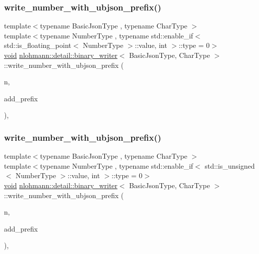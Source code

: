 \subsubsection{\texorpdfstring{write\+\_\+number\+\_\+with\+\_\+ubjson\+\_\+prefix()}{write\_number\_with\_ubjson\_prefix()}\hspace{0.1cm}{\footnotesize\ttfamily [1/3]}}
{\footnotesize\ttfamily template$<$typename Basic\+Json\+Type , typename Char\+Type $>$ \\
template$<$typename Number\+Type , typename std\+::enable\+\_\+if$<$ std\+::is\+\_\+floating\+\_\+point$<$ Number\+Type $>$\+::value, int $>$\+::type  = 0$>$ \\
\hyperlink{namespacenlohmann_1_1detail_a59fca69799f6b9e366710cb9043aa77d}{void} \hyperlink{classnlohmann_1_1detail_1_1binary__writer}{nlohmann\+::detail\+::binary\+\_\+writer}$<$ Basic\+Json\+Type, Char\+Type $>$\+::write\+\_\+number\+\_\+with\+\_\+ubjson\+\_\+prefix (\begin{DoxyParamCaption}\item[{const Number\+Type}]{n,  }\item[{const bool}]{add\+\_\+prefix }\end{DoxyParamCaption})\hspace{0.3cm}{\ttfamily [inline]}, {\ttfamily [private]}}

\mbox{\label{classnlohmann_1_1detail_1_1binary__writer_a0ea6745f944c0c61672146886b4ee90f}} 
\subsubsection{\texorpdfstring{write\+\_\+number\+\_\+with\+\_\+ubjson\+\_\+prefix()}{write\_number\_with\_ubjson\_prefix()}\hspace{0.1cm}{\footnotesize\ttfamily [2/3]}}
{\footnotesize\ttfamily template$<$typename Basic\+Json\+Type , typename Char\+Type $>$ \\
template$<$typename Number\+Type , typename std\+::enable\+\_\+if$<$ std\+::is\+\_\+unsigned$<$ Number\+Type $>$\+::value, int $>$\+::type  = 0$>$ \\
\hyperlink{namespacenlohmann_1_1detail_a59fca69799f6b9e366710cb9043aa77d}{void} \hyperlink{classnlohmann_1_1detail_1_1binary__writer}{nlohmann\+::detail\+::binary\+\_\+writer}$<$ Basic\+Json\+Type, Char\+Type $>$\+::write\+\_\+number\+\_\+with\+\_\+ubjson\+\_\+prefix (\begin{DoxyParamCaption}\item[{const Number\+Type}]{n,  }\item[{const bool}]{add\+\_\+prefix }\end{DoxyParamCaption})\hspace{0.3cm}{\ttfamily [inline]}, {\ttfamily [private]}}

